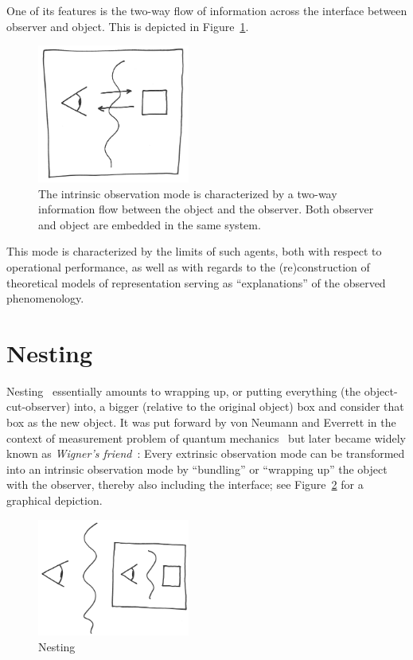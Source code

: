 One of its features is the two-way flow of information across the interface between observer and object.
This is  depicted   in Figure~\ref{2016-pu-book-chapter-eo-figure-intrinsic}.
\begin{figure}
\begin{center}
\includegraphics[width=5cm,angle=2]{2016-pu-book-chapter-eo-figure-intrinsic}
\end{center}
\caption{
The intrinsic observation mode is characterized by a two-way information flow between the object and the observer.
Both observer and object are embedded in the same system.
\label{2016-pu-book-chapter-eo-figure-intrinsic}
}
\end{figure}

This mode is characterized by the limits of such agents, both with respect to operational performance,
as well as with regards to the (re)construction of theoretical models of representation
serving as ``explanations'' of the observed phenomenology.

\section{Nesting}
\label{2016-pu-book-nesting}

Nesting~\cite{sep-qm-everett,Barrett-16} essentially amounts to  wrapping up, or putting everything (the object-cut-observer) into,  a bigger (relative to the original object) box and consider that box as the new object.
It
was  put forward by von Neumann and Everrett in the context of measurement problem of quantum mechanics~\cite{everett}
but later became widely known as
{\em Wigner's friend}~\cite{wigner:mb}:
Every extrinsic observation mode can be transformed into an intrinsic observation mode
by ``bundling'' or ``wrapping up''
the object with the observer, thereby also including the interface;
see Figure~\ref{2016-pu-book-chapter-eo-figure-nesting} for a graphical depiction.
\begin{figure}
\begin{center}
\includegraphics[width=5cm,angle=10]{2016-pu-book-chapter-eo-figure-nesting}
\end{center}
\caption{
Nesting
\label{2016-pu-book-chapter-eo-figure-nesting}
}
\end{figure}

